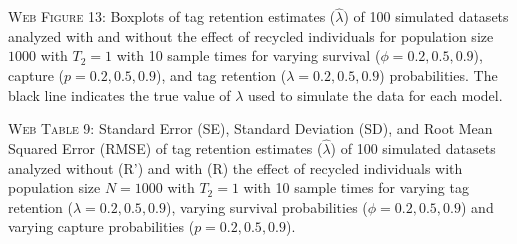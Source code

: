 \documentclass[]{article}
\begin{document}
\textsc{Web Figure 13:} Boxplots of tag retention estimates
(\(\hat{\lambda}\)) of 100 simulated datasets analyzed with and without
the effect of recycled individuals for population size \(1000\) with
\(T_2=1\) with 10 sample times for varying survival
(\(\phi=0.2,0.5,0.9\)), capture (\(p=0.2,0.5,0.9\)), and tag retention
(\(\lambda=0.2,0.5,0.9\)) probabilities. The black line indicates the
true value of \(\lambda\) used to simulate the data for each model.

\textsc{Web Table 9:} Standard Error (SE), Standard Deviation (SD), and
Root Mean Squared Error (RMSE) of tag retention estimates
(\(\hat{\lambda}\)) of 100 simulated datasets analyzed without (R') and
with (R) the effect of recycled individuals with population size
\(N=1000\) with \(T_2=1\) with 10 sample times for varying tag retention
(\(\lambda=0.2,0.5,0.9\)), varying survival probabilities
(\(\phi=0.2,0.5,0.9\)) and varying capture probabilities
(\(p=0.2,0.5,0.9\)).
\end{document}
